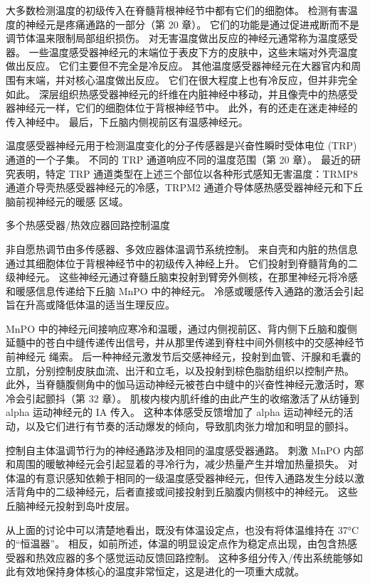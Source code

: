 大多数检测温度的初级传入在脊髓背根神经节中都有它们的细胞体。 检测有害温度的神经元是疼痛通路的一部分（第 20 章）。 它们的功能是通过促进戒断而不是调节体温来限制局部组织损伤。 对无害温度做出反应的神经元通常称为温度感受器。 一些温度感受器神经元的末端位于表皮下方的皮肤中，这些末端对外壳温度做出反应。 它们主要但不完全是冷反应。 其他温度感受器神经元在大器官内和周围有末端，并对核心温度做出反应。 它们在很大程度上也有冷反应，但并非完全如此。 深层组织热感受器神经元的纤维在内脏神经中移动，并且像壳中的热感受器神经元一样，它们的细胞体位于背根神经节中。 此外，有的还走在迷走神经的传入神经中。 最后，下丘脑内侧视前区有温感神经元。

温度感受器神经元用于检测温度变化的分子传感器是兴奋性瞬时受体电位 (TRP) 通道的一个子集。 不同的 TRP 通道响应不同的温度范围（第 20 章）。 最近的研究表明，特定 TRP 通道类型在上述三个部位以各种形式感知无害温度：TRMP8 通道介导壳热感受器神经元的冷感，TRPM2 通道介导体感热感受器神经元和下丘脑前视神经元的暖感 区域。

多个热感受器/热效应器回路控制温度

非自愿热调节由多传感器、多效应器体温调节系统控制。 来自壳和内脏的热信息通过其细胞体位于背根神经节中的初级传入神经上升。 它们投射到脊髓背角的二级神经元。 这些神经元通过脊髓丘脑束投射到臂旁外侧核，在那里神经元将冷感和暖感信息传递给下丘脑 MnPO 中的神经元。 冷感或暖感传入通路的激活会引起旨在升高或降低体温的适当生理反应。

MnPO 中的神经元间接响应寒冷和温暖，通过内侧视前区、背内侧下丘脑和腹侧延髓中的苍白中缝传递传出信号，并从那里传递到脊柱中间外侧核中的交感神经节前神经元 绳索。 后一种神经元激发节后交感神经元，投射到血管、汗腺和毛囊的立肌，分别控制皮肤血流、出汗和立毛，以及投射到棕色脂肪组织以控制产热。 此外，当脊髓腹侧角中的伽马运动神经元被苍白中缝中的兴奋性神经元激活时，寒冷会引起颤抖（第 32 章）。 肌梭内梭内肌纤维的由此产生的收缩激活了从纺锤到 alpha 运动神经元的 IA 传入。 这种本体感受反馈增加了 alpha 运动神经元的活动，以及它们进行有节奏的活动爆发的倾向，导致肌肉张力增加和明显的颤抖。

控制自主体温调节行为的神经通路涉及相同的温度感受器通路。 刺激 MnPO 内部和周围的暖敏神经元会引起显着的寻冷行为，减少热量产生并增加热量损失。 对体温的有意识感知依赖于相同的一级温度感受器神经元，但传入通路发生分歧以激活背角中的二级神经元，后者直接或间接投射到丘脑腹内侧核中的神经元。 这些丘脑神经元投射到岛叶皮层。

从上面的讨论中可以清楚地看出，既没有体温设定点，也没有将体温维持在 37°C 的“恒温器”。 相反，如前所述，体温的明显设定点作为稳定点出现，由包含热感受器和热效应器的多个感觉运动反馈回路控制。 这种多组分传入/传出系统能够如此有效地保持身体核心的温度非常恒定，这是进化的一项重大成就。

